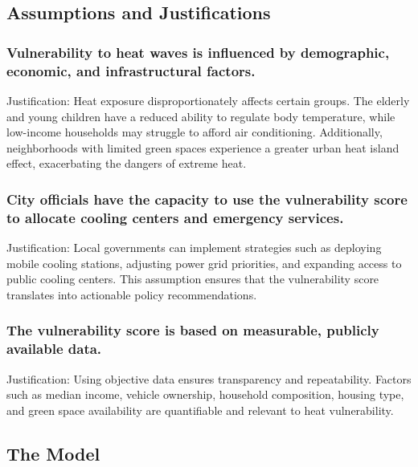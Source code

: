 \documentclass[12pt]{article}
\begin{document}
\subsection{Assumptions and Justifications}

\subsubsection{Vulnerability to heat waves is influenced by demographic, economic, and infrastructural factors.}
Justification: Heat exposure disproportionately affects certain groups. The elderly and young children have a reduced ability to regulate body temperature, while low-income households may struggle to afford air conditioning. Additionally, neighborhoods with limited green spaces experience a greater urban heat island effect, exacerbating the dangers of extreme heat.\cite{https://journals.ametsoc.org/view/journals/wcas/6/2/wcas-d-13-00037_1.pdf}
  
\subsubsection{City officials have the capacity to use the vulnerability score to allocate cooling centers and emergency services.}
Justification: Local governments can implement strategies such as deploying mobile cooling stations, adjusting power grid priorities, and expanding access to public cooling centers. This assumption ensures that the vulnerability score translates into actionable policy recommendations.
  
\subsubsection{The vulnerability score is based on measurable, publicly available data.}
Justification: Using objective data ensures transparency and repeatability. Factors such as median income, vehicle ownership, household composition, housing type, and green space availability are quantifiable and relevant to heat vulnerability.

\subsection{The Model}
\end{document}
